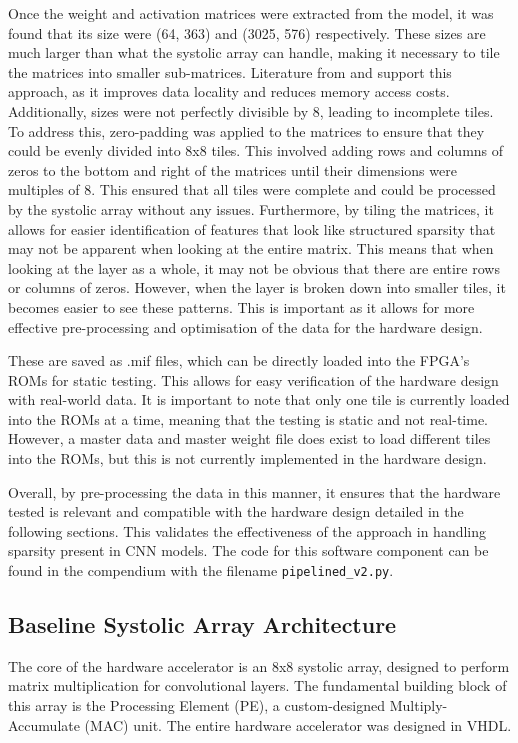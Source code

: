 \documentclass[12pt, a4paper, ukenglish]{article}
\begin{document}
        Once the weight and activation matrices were extracted from the model, it was found that its size were (64, 363) and (3025, 576) respectively. These sizes are much larger than what the systolic array can handle, making it necessary to tile the matrices into smaller sub-matrices. Literature from \textcite{palacios_systolic_2025} and \textcite{parashar_scnn_2017} support this approach, as it improves data locality and reduces memory access costs. Additionally, sizes were not perfectly divisible by 8, leading to incomplete tiles. To address this, zero-padding was applied to the matrices to ensure that they could be evenly divided into 8x8 tiles. This involved adding rows and columns of zeros to the bottom and right of the matrices until their dimensions were multiples of 8. This ensured that all tiles were complete and could be processed by the systolic array without any issues. 
        Furthermore, by tiling the matrices, it allows for easier identification of features that look like structured sparsity that may not be apparent when looking at the entire matrix. This means that when looking at the layer as a whole, it may not be obvious that there are entire rows or columns of zeros. However, when the layer is broken down into smaller tiles, it becomes easier to see these patterns. This is important as it allows for more effective pre-processing and optimisation of the data for the hardware design.

        These are saved as .mif files, which can be directly loaded into the FPGA's ROMs for static testing. This allows for easy verification of the hardware design with real-world data. It is important to note that only one tile is currently loaded into the ROMs at a time, meaning that the testing is static and not real-time. However, a master data and master weight file does exist to load different tiles into the ROMs, but this is not currently implemented in the hardware design.
       

        Overall, by pre-processing the data in this manner, it ensures that the hardware tested is relevant and compatible with the hardware design detailed in the following sections. This validates the effectiveness of the approach in handling sparsity present in CNN models. The code for this software component can be found in the compendium with the filename \texttt{pipelined\_v2.py}.
        
    \subsection{Baseline Systolic Array Architecture} \label{sec: baseline}
    The core of the hardware accelerator is an 8x8 systolic array, designed to perform matrix multiplication for convolutional layers. The fundamental building block of this array is the Processing Element (PE), a custom-designed Multiply-Accumulate (MAC) unit. The entire hardware accelerator was designed in VHDL.
    
\end{document}
